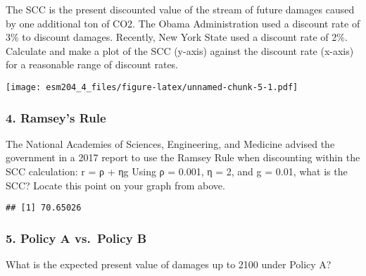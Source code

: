 \documentclass[
]{article}
\newenvironment{Shaded}{\begin{snugshade}}{\end{snugshade}}
\newcommand{\CommentTok}[1]{\textcolor[rgb]{0.56,0.35,0.01}{\textit{#1}}}
\newcommand{\DecValTok}[1]{\textcolor[rgb]{0.00,0.00,0.81}{#1}}
\newcommand{\FunctionTok}[1]{\textcolor[rgb]{0.00,0.00,0.00}{#1}}
\newcommand{\NormalTok}[1]{#1}
\newcommand{\OtherTok}[1]{\textcolor[rgb]{0.56,0.35,0.01}{#1}}
\newcommand{\SpecialCharTok}[1]{\textcolor[rgb]{0.00,0.00,0.00}{#1}}
\begin{document}
The SCC is the present discounted value of the stream of future damages
caused by one additional ton of CO2. The Obama Administration used a
discount rate of 3\% to discount damages. Recently, New York State used
a discount rate of 2\%. Calculate and make a plot of the SCC (y-axis)
against the discount rate (x-axis) for a reasonable range of discount
rates.

\texttt{[image: esm204\_4\_files/figure-latex/unnamed-chunk-5-1.pdf]}

\hypertarget{ramseys-rule}{%
\subsubsection{4. Ramsey's Rule}\label{ramseys-rule}}

The National Academies of Sciences, Engineering, and Medicine advised
the government in a 2017 report to use the Ramsey Rule when discounting
within the SCC calculation: r = ρ + ηg Using ρ = 0.001, η = 2, and g =
0.01, what is the SCC? Locate this point on your graph from above.

\begin{Shaded}
\end{Shaded}

\begin{verbatim}
## [1] 70.65026
\end{verbatim}

\hypertarget{policy-a-vs.-policy-b}{%
\subsubsection{5. Policy A vs.~Policy B}\label{policy-a-vs.-policy-b}}

What is the expected present value of damages up to 2100 under Policy A?
\end{document}
